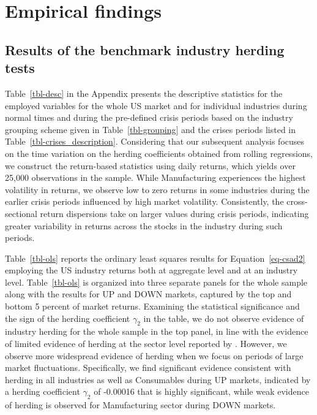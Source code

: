 \documentclass[
  letterpaper,
  DIV=11,
  numbers=noendperiod]{scrartcl}
\begin{document}
\section{Empirical findings}\label{empirical-findings}

\subsection{Results of the benchmark industry herding
tests}\label{results-of-the-benchmark-industry-herding-tests}

Table~\ref{tbl-desc} in the Appendix presents the descriptive statistics
for the employed variables for the whole US market and for individual
industries during normal times and during the pre-defined crisis periods
based on the industry grouping scheme given in Table~\ref{tbl-grouping}
and the crises periods listed in Table~\ref{tbl-crises_description}.
Considering that our subsequent analysis focuses on the time variation
on the herding coefficients obtained from rolling regressions, we
construct the return-based statistics using daily returns, which yields
over 25,000 observations in the sample. While Manufacturing experiences
the highest volatility in returns, we observe low to zero returns in
some industries during the earlier crisis periods influenced by high
market volatility. Consistently, the cross-sectional return dispersions
take on larger values during crisis periods, indicating greater
variability in returns across the stocks in the industry during such
periods.

Table~\ref{tbl-ols} reports the ordinary least squares results for
Equation~\ref{eq-csad2} employing the US industry returns both at
aggregate level and at an industry level. Table~\ref{tbl-ols} is
organized into three separate panels for the whole sample along with the
results for UP and DOWN markets, captured by the top and bottom 5
percent of market returns. Examining the statistical significance and
the sign of the herding coefficient \(\gamma_2\) in the table, we do not
observe evidence of industry herding for the whole sample in the top
panel, in line with the evidence of limited evidence of herding at the
sector level reported by \citet{ukpong2021determinants}. However, we
observe more widespread evidence of herding when we focus on periods of
large market fluctuations. Specifically, we find significant evidence
consistent with herding in all industries as well as Consumables during
UP markets, indicated by a herding coefficient \(\gamma_2\) of -0.00016
that is highly significant, while weak evidence of herding is observed
for Manufacturing sector during DOWN markets.
\end{document}
